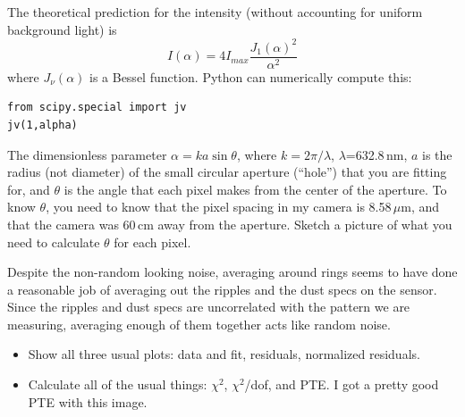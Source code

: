 \documentclass[11pt]{hmcpset}
\begin{document}
\begin{problem}
The theoretical prediction for the intensity (without accounting for uniform background light) is
\[
I(\alpha) = 4 I_{max} \frac{J_1(\alpha)^2}{\alpha^2}
\]
where $J_\nu(\alpha)$ is a Bessel function. Python can numerically compute this:
\begin{lstlisting}[style=Python]
from scipy.special import jv
jv(1,alpha)
\end{lstlisting}
The dimensionless parameter $\alpha = ka \sin{\theta}$, where $k=2\pi/\lambda$, $\lambda$=632.8\,nm, $a$ is the radius (not diameter) of the small circular aperture (``hole'') that you are fitting for, and $\theta$ is the angle that each pixel makes from the center of the aperture. To know $\theta$, you need to know that the pixel spacing in my camera is 8.58\,$\mu$m, and that the camera was 60\,cm away from the aperture. Sketch a picture of what you need to calculate $\theta$ for each pixel.

Despite the non-random looking noise, averaging around rings seems to have done a reasonable job of averaging out the ripples and the dust specs on the sensor. Since the ripples and dust specs are uncorrelated with the pattern we are measuring, averaging enough of them together acts like random noise.

\begin{itemize}
	\item Show all three usual plots: data and fit, residuals, normalized residuals.
	\item Calculate all of the usual things: $\chi^2$, $\chi^2$/dof, and PTE. I got a pretty good PTE with this image.
\end{itemize}

\end{problem}
\pagebreak
\end{document}
